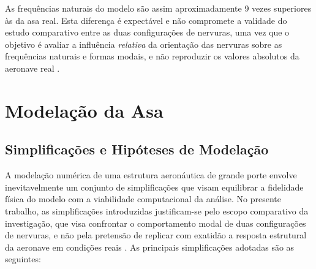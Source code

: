 \documentclass[11pt,oneside,a4paper,final]{report}
\begin{document}
As frequências naturais do modelo são assim aproximadamente 9 vezes superiores às da asa real. Esta diferença é expectável e não compromete a validade do estudo comparativo entre as duas configurações de nervuras, uma vez que o objetivo é avaliar a influência \textit{relativa} da orientação das nervuras sobre as frequências naturais e formas modais, e não reproduzir os valores absolutos da aeronave real \cite{Dowell2004}.

\chapter{Modelação da Asa}
\label{chap:modelacao}

\section{Simplificações e Hipóteses de Modelação}
\label{sec:simplificacoes}

A modelação numérica de uma estrutura aeronáutica de grande porte envolve inevitavelmente um conjunto de simplificações que visam equilibrar a fidelidade física do modelo com a viabilidade computacional da análise. No presente trabalho, as simplificações introduzidas justificam-se pelo escopo comparativo da investigação, que visa confrontar o comportamento modal de duas configurações de nervuras, e não pela pretensão de replicar com exatidão a resposta estrutural da aeronave em condições reais \cite{Dowell2004}. As principais simplificações adotadas são as seguintes:
\end{document}
